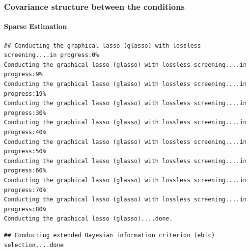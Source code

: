 \begin{frame}[containsverbatim]
\frametitle{Covariance structure between the conditions}
\framesubtitle{Sparse Estimation}

\begin{knitrout}\scriptsize
{}\color{fgcolor}\begin{kframe}
\begin{alltt}
 \hlkwb{<-} \hlstd{(} \hlstd{=}\hlstd{,} \hlstd{=}\hlstd{)}
\end{alltt}
\begin{verbatim}
## Conducting the graphical lasso (glasso) with lossless screening....in progress:0% 
Conducting the graphical lasso (glasso) with lossless screening....in progress:9% 
Conducting the graphical lasso (glasso) with lossless screening....in progress:19% 
Conducting the graphical lasso (glasso) with lossless screening....in progress:30% 
Conducting the graphical lasso (glasso) with lossless screening....in progress:40% 
Conducting the graphical lasso (glasso) with lossless screening....in progress:50% 
Conducting the graphical lasso (glasso) with lossless screening....in progress:60% 
Conducting the graphical lasso (glasso) with lossless screening....in progress:70% 
Conducting the graphical lasso (glasso) with lossless screening....in progress:80% 
Conducting the graphical lasso (glasso)....done.                                          
\end{verbatim}
\begin{alltt}
  \hlkwb{<-} 
\end{alltt}
\begin{verbatim}
## Conducting extended Bayesian information criterion (ebic) selection....done
\end{verbatim}
\end{kframe}
\end{knitrout}
\end{frame}

